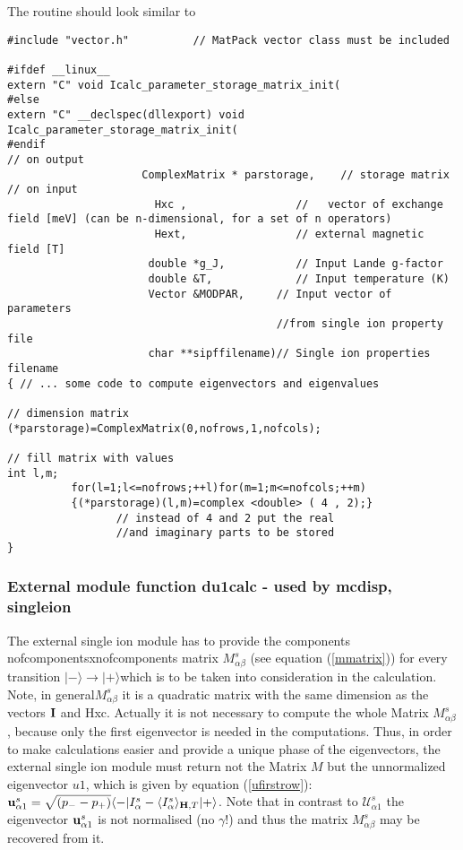 The routine should look similar to
{\footnotesize
\begin{verbatim}
#include "vector.h"          // MatPack vector class must be included

#ifdef __linux__
extern "C" void Icalc_parameter_storage_matrix_init(
#else
extern "C" __declspec(dllexport) void Icalc_parameter_storage_matrix_init(
#endif
// on output
                     ComplexMatrix * parstorage,    // storage matrix
// on input
                       Hxc ,                 //   vector of exchange field [meV] (can be n-dimensional, for a set of n operators)
                       Hext,                 // external magnetic field [T]
                      double *g_J,           // Input Lande g-factor
                      double &T,             // Input temperature (K)
                      Vector &MODPAR,     // Input vector of parameters 
                                          //from single ion property file
                      char **sipffilename)// Single ion properties filename
{ // ... some code to compute eigenvectors and eigenvalues

// dimension matrix
(*parstorage)=ComplexMatrix(0,nofrows,1,nofcols);

// fill matrix with values
int l,m;
          for(l=1;l<=nofrows;++l)for(m=1;m<=nofcols;++m)
          {(*parstorage)(l,m)=complex <double> ( 4 , 2);}
                 // instead of 4 and 2 put the real 
                 //and imaginary parts to be stored
}
\end{verbatim}
}


\subsubsection{External module function {\prg du1calc} - used by {\prg mcdisp},{\prg %
singleion}}

The external single ion module has to provide the components nofcomponentsxnofcomponents
matrix $M^s_{\alpha\beta}$ (see equation (\ref{mmatrix})) for every transition
$|-\rangle \rightarrow |+\rangle$which is to be taken into consideration 
in the calculation. Note, in general$M^s_{\alpha\beta}$ it is a quadratic matrix with the same
dimension as the vectors $\mathbf I$ and Hxc. 
Actually it is not necessary to compute the whole  Matrix $M^s_{\alpha\beta}$, because
only the first eigenvector is needed in the computations.
Thus, in order to make calculations easier and provide a unique phase of the eigenvectors, the 
external single ion module must return not the Matrix $M$ but the unnormalized
eigenvector $u1$, which is given by equation (\ref{ufirstrow}):
 ${\mathbf u^s_{\alpha1}}=\sqrt{(p_--p_+)}\langle -|I^s_{\alpha}-\langle I^s_{\alpha}\rangle_{\mathbf H,T}|+\rangle$. 
Note that in contrast to ${\mathcal U^s_{\alpha1}}$ the eigenvector
${\mathbf u^s_{\alpha1}}$ is not normalised (no $\gamma$!)
and thus the matrix  $M^s_{\alpha\beta}$ may be recovered from it.

